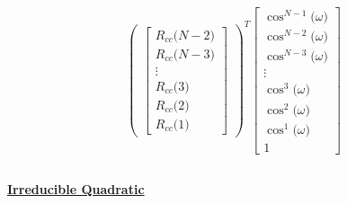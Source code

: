 \documentclass{article}
\begin{document}
\begin{align*}
\begin{pmatrix}
\begin{bmatrix}
                                                                R_{cc}\big(N - 2\big) \\
                                                                R_{cc}\big(N - 3\big) \\
                                                                \vdots \\
                                                                R_{cc}\big(3\big) \\
                                                                R_{cc}\big(2\big) \\
                                                                R_{cc}\big(1\big)
                                                              \end{bmatrix}
                                                              \end{pmatrix}^{T}
                                                        \begin{bmatrix}
                                                            \cos^{N - 1}\big(\omega\big) \\
                                                            \cos^{N - 2}\big(\omega\big) \\
                                                            \cos^{N - 3}\big(\omega\big) \\
                                                            \vdots \\
                                                            \cos^{3}\big(\omega\big) \\
                                                            \cos^{2}\big(\omega\big) \\
                                                            \cos^{1}\big(\omega\big) \\
                                                            1 
                                                          \end{bmatrix} \\ \\
\end{align*}

\textbf{\underline{Irreducible Quadratic}}
\end{document}
